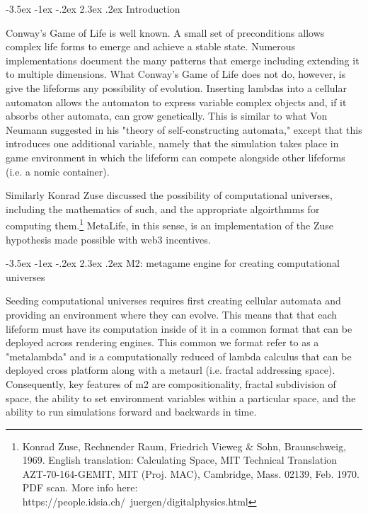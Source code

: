 \documentclass[11pt]{article}
\makeatletter
\renewcommand\section{\@startsection {section}{1}{\z@}%
                                       {-3.5ex \@plus -1ex \@minus -.2ex}%
                                       {2.3ex \@plus.2ex}%
                                       {\normalfont\fontfamily{phv}\fontsize{16}{19}\bfseries}}
\makeatother
\begin{document}


\section{Introduction} \label{s:intro}

Conway's Game of Life is well known. A small set of preconditions allows complex life forms to emerge and achieve a stable state. Numerous implementations document the many patterns that emerge including extending it to multiple dimensions. What Conway's Game of Life does not do, however, is give the lifeforms any possibility of evolution. Inserting lambdas into a cellular automaton allows the automaton to express variable complex objects and, if it absorbs other automata, can grow genetically. This is similar to what Von Neumann suggested in his "theory of self-constructing automata," except that this introduces one additional variable, namely that the simulation takes place in game environment in which the lifeform can compete alongside other lifeforms (i.e. a nomic container). 

Similarly Konrad Zuse discussed the possibility of computational universes, including the mathematics of such, and the appropriate algoirthmms for computing them.\footnote{Konrad Zuse, Rechnender Raum, Friedrich Vieweg & Sohn, Braunschweig, 1969.
English translation: Calculating Space, MIT Technical Translation AZT-70-164-GEMIT, MIT (Proj. MAC), Cambridge, Mass. 02139, Feb. 1970. PDF scan. More info here: https://people.idsia.ch/~juergen/digitalphysics.html} MetaLife, in this sense, is an implementation of the Zuse hypothesis made possible with web3 incentives. 

\section{M2: metagame engine for creating computational universes} \label{s:numerical}

Seeding computational universes requires first creating cellular automata and providing an environment where they can evolve. This means that that each lifeform must have its computation inside of it in a common format that can be deployed across rendering engines. This common we format refer to as a "metalambda" and is a computationally reduced of lambda calculus that can be deployed cross platform along with a metaurl (i.e. fractal addressing space). Consequently, key features of m2 are compositionality, fractal subdivision of space, the ability to set environment variables within a particular space, and the ability to run simulations forward and backwards in time.
\end{document}
